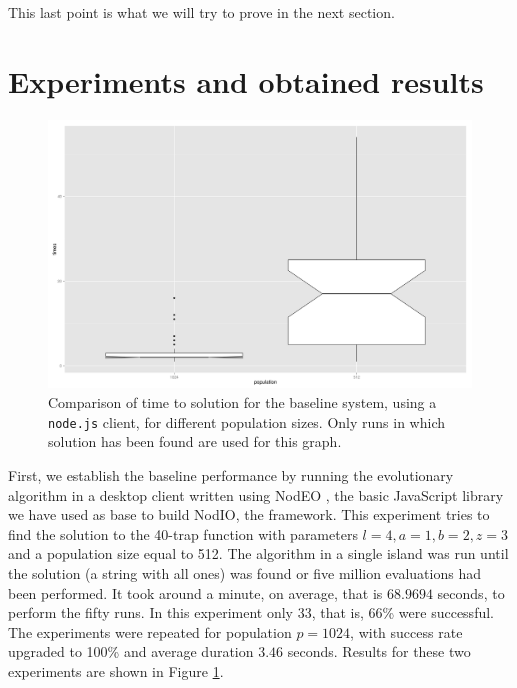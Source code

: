 \documentclass[journal,onecolumn]{IEEEtran}
\begin{document}
This last point is what we will try to prove in the next section.

\section{Experiments and obtained results}
\label{sec:experiments}

\begin{figure}[!t]
\centering
\includegraphics[width=12cm]{img/baseline-times.png}
\caption{Comparison of time to solution for the baseline system, using a {\tt
    node.js} client, for different population sizes. Only
runs in which solution has been found are used for this graph.}
\label{fig:baseline}
\end{figure}
First, we establish the baseline performance by running the
evolutionary algorithm in a desktop client written using NodEO
\cite{nodeo2014}, the basic JavaScript library we have used as base to
build {\sf NodIO}, the framework. This experiment tries to 
find the solution to the 40-trap function with parameters $l=4, a=1,
b=2, z=3$ and a population size equal to 512. The algorithm in a
single island was run until the solution (a string with all
ones) was found or five million evaluations had been performed. It
took around a minute, on average, that is $68.9694$ seconds, to
perform the fifty runs. In this experiment only 33, that is, 66\% were
successful. The experiments were repeated for population $p=1024$,
with success rate upgraded to 100\% and average duration $3.46$
seconds. Results for these two experiments
are shown in Figure \ref{fig:baseline}. %
\end{document}

